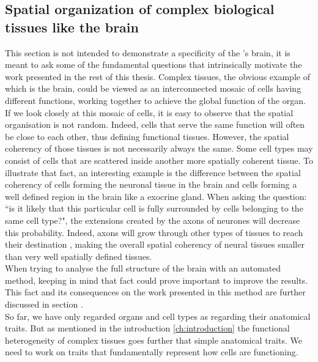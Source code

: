           \subsection{Spatial organization of complex biological tissues like the brain}
     This section is not intended to demonstrate a specificity of the \platy{}'s brain, it is meant to ask some of the fundamental questions that intrinsically motivate the work presented in the rest of this thesis. Complex tissues, the obvious example of which is the brain, could be viewed as an interconnected mosaic of cells having different functions, working together to achieve the global function of the organ.\\
     
     If we look closely at this mosaic of cells, it is easy to observe that the spatial organisation is not random. Indeed, cells that serve the same function will often be close to each other, thus defining functional tissues. However, the spatial coherency of those tissues is not necessarily always the same. Some cell types may consist of cells that are scattered inside another more spatially coherent tissue. To illustrate that fact, an interesting example is the difference between the spatial coherency of cells forming the neuronal tissue in the brain and cells forming a well defined region in the brain like a exocrine gland. When asking the question: ``is it likely that this particular cell is fully surrounded by cells belonging to the same cell type?", the extensions created by the axons of neurones will decrease this probability. Indeed, axons will grow through other types of tissues to reach their destination \cite{bartlett84,colello90}, making the overall spatial coherency of neural tissues smaller than very well spatially defined tissues.\\
     
     When trying to analyse the full structure of the brain with an automated method, keeping in mind that fact could prove important to improve the results. This fact and its consequences on the work presented in this method are further discussed in section .\\
     
     So far, we have only regarded organs and cell types as regarding their anatomical traits. But as mentioned in the introduction \ref{ch:introduction} the functional heterogeneity of complex tissues goes further that simple anatomical traits. We need to work on traits that fundamentally represent how cells are functioning.
     
